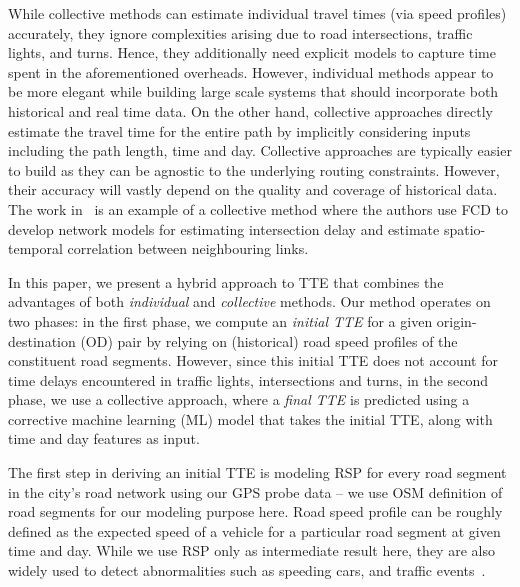 While collective methods can estimate individual travel times (via speed profiles) accurately, they ignore complexities arising due to road intersections, traffic lights, and turns. Hence, they additionally need  explicit models to capture time spent in the aforementioned overheads. However, individual methods appear to be more elegant while building large scale systems that should incorporate both historical and real time data.  
%
On the other hand, collective approaches  directly estimate the travel time for the entire path by implicitly considering inputs including the path length, time and day. Collective approaches are typically easier to build as they can be agnostic to the underlying routing constraints. However, their accuracy will vastly depend on the quality and coverage of historical data. The work in~\cite{jenelius2013travel} is an example of a collective method where the authors use \ac{FCD} to develop network models for estimating intersection delay and estimate spatio-temporal correlation between neighbouring links.


In this paper, we present a hybrid approach to \ac{TTE} that combines the advantages of both \emph{individual} and \emph{collective} methods. Our method operates on two phases: in the first phase, we compute an \emph{initial TTE} for a given origin-destination (OD) pair by relying on (historical) road speed profiles of the constituent road segments. However, since this initial TTE does not account for time delays encountered in traffic lights, intersections and turns,  in the second phase, we use a collective approach, where a \emph{final TTE} is predicted using a corrective machine learning (ML) model that takes the initial \ac{TTE}, along with time and day features as input. 

The first step in deriving an initial TTE is modeling \ac{RSP} for every road segment in the city's road network using our GPS probe data -- we use \ac{OSM} definition of road segments for our modeling purpose here. Road speed profile can be roughly defined as the expected speed of a vehicle for a particular road segment at given time and day. While we use \ac{RSP} only as intermediate result here, they are also widely used to detect abnormalities such as speeding cars, and traffic events~\cite{asakura2015incident}. 

